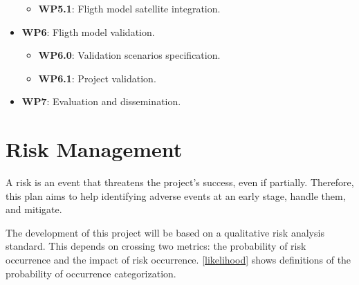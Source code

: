 \begin{itemize}
\begin{itemize}
            \item \textbf{WP5.1}: Fligth model satellite integration.
        \end{itemize}
    \item \textbf{WP6}: Fligth model validation.
        \begin{itemize}
            \item \textbf{WP6.0}: Validation scenarios specification.
            \item \textbf{WP6.1}: Project validation.
        \end{itemize}
    \item \textbf{WP7}: Evaluation and dissemination.
\end{itemize}


\section{Risk Management}

A risk is an event that threatens the project's success, even if partially. Therefore, this plan aims to help identifying adverse events at an early stage, handle them, and mitigate.

The development of this project will be based on a qualitative risk analysis standard. This depends on crossing two metrics: the probability of risk occurrence and the impact of risk occurrence. \autoref{likelihood} shows definitions of the probability of occurrence categorization.

